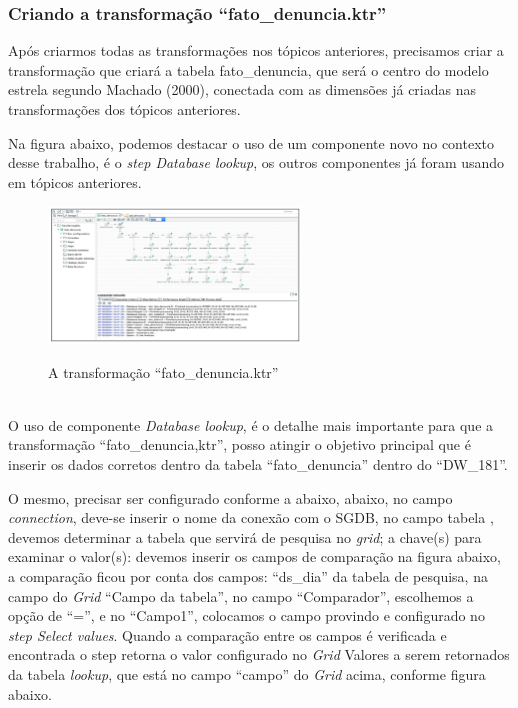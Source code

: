 \subsubsection{Criando a transforma\c{c}\~{a}o ``fato\_denuncia.ktr''}

Ap\'os criarmos todas as transforma\c{c}\~{o}es nos t\'opicos anteriores,
 precisamos criar a transforma\c{c}\~{a}o que criar\'{a} a tabela fato\_denuncia, que ser\'{a} o centro do modelo estrela segundo Machado (2000), conectada com as dimens\~{o}es j\'{a} criadas nas transforma\c{c}\~{o}es dos t\'opicos anteriores.

Na figura abaixo, podemos destacar o uso de um componente novo no contexto desse trabalho, \'{e} o \textit{step Database lookup}, os outros componentes j\'{a} foram usando em t\'opicos anteriores.

\begin{figure}[H]
	\vspace*{0,2cm}
    \centering
    \caption{A transforma\c{c}\~{a}o ``fato\_denuncia.ktr''}
    \includegraphics[width=0.6\textwidth]{./04-figuras/figura-fato}
    \label{fig:ilustfigfato}
\end{figure}
\vspace*{-0,9cm}
{\raggedright {}} \\

O uso de componente \textit{Database lookup}, \'{e} o detalhe mais importante para que a transforma\c{c}\~{a}o ``fato\_denuncia,ktr'', posso atingir o objetivo principal que \'{e} inserir os dados corretos dentro da tabela ``fato\_denuncia'' dentro do ``DW\_181''. 

O mesmo, precisar ser configurado conforme a abaixo, abaixo, no campo \textit{connection}, deve-se inserir o nome da conex\~{a}o com o SGDB, no campo tabela , devemos determinar a tabela que servir\'{a} de pesquisa no \textit{grid}; a chave(s) para examinar o valor(s): devemos inserir os campos de compara\c{c}\~{a}o na figura abaixo, a compara\c{c}\~{a}o ficou por conta dos campos: ``ds\_dia''  da tabela de pesquisa, na campo do \textit{Grid} ``Campo da tabela'', no campo ``Comparador'', escolhemos a op\c{c}\~{a}o de ``='', e no ``Campo1'', colocamos o campo provindo e configurado no \textit{step Select values}. Quando a compara\c{c}\~{a}o entre os campos \'{e} verificada e encontrada o step retorna o valor configurado no \textit{Grid} Valores a serem retornados da tabela \textit{lookup}, que est\'{a} no campo 
``campo'' do \textit{Grid} acima, conforme figura abaixo.

